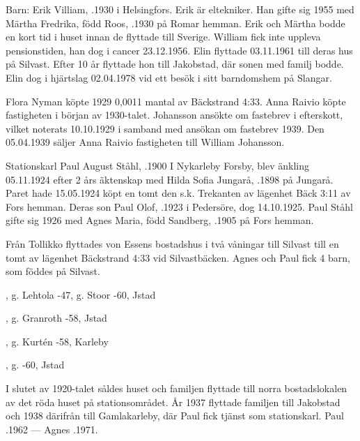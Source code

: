 Barn: Erik Villiam, .1930 i Helsingfors. Erik är eltekniker. Han gifte sig 1955 med 	Märtha Fredrika, född Roos, .1930 på Romar hemman. Erik och Märtha bodde en kort tid i huset innan de flyttade till Sverige. William fick inte uppleva pensionstiden, han dog i cancer 23.12.1956. Elin flyttade 03.11.1961 till deras hus på Silvast. Efter 10 år flyttade hon till Jakobstad, där sonen med familj bodde. Elin dog i hjärtslag 02.04.1978 vid ett besök i sitt barndomshem på Slangar.


Flora Nyman köpte 1929 0,0011 mantal av Bäckstrand 4:33. Anna Raivio  köpte fastigheten i början av 1930-talet. Johansson ansökte om fastebrev i efterskott, vilket noterats 10.10.1929 i samband med ansökan	om fastebrev 1939. Den 05.04.1939 säljer Anna Raivio fastigheten till William Johansson.


Stationskarl Paul August Ståhl, .1900 I Nykarleby Forsby, blev änkling 05.11.1924 efter 2 års äktenskap med Hilda Sofia Jungarå, .1898 på Jungarå. Paret hade 15.05.1924	köpt en tomt den s.k. Trekanten av lägenhet Bäck 3:11 av Fors hemman. Deras son Paul Olof, .1923 i Pedersöre, dog 14.10.1925.	Paul Ståhl gifte sig 1926 med Agnes Maria, född Sandberg, .1905 på Fors hemman.

Från Tollikko flyttades von Essens bostadshus i två våningar till	Silvast till en tomt av lägenhet Bäckstrand 4:33 vid Silvastbäcken. Agnes och Paul fick 4 barn, som föddes på Silvast.
\begin{jhchildren}
  \item {}, g. Lehtola -47, g. Stoor -60, Jstad
  \item {}, g. Granroth -58, Jstad
  \item {}, g. Kurtén -58, Karleby
  \item {}, g. -60, Jstad
\end{jhchildren}
I slutet av 1920-talet såldes huset och familjen flyttade till norra bostadslokalen av det röda huset på stationsområdet. År 1937 flyttade 	familjen till Jakobstad och 1938 därifrån till Gamlakarleby, där Paul fick tjänst som stationskarl.  Paul .1962  ---  Agnes .1971.


